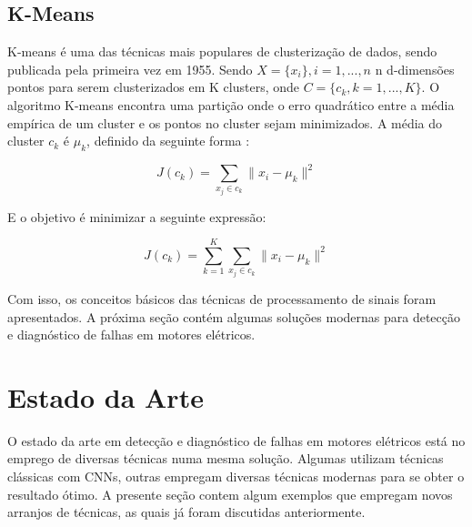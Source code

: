 % 

\subsection{K-Means}

K-means é uma das técnicas mais populares de clusterização de dados, sendo publicada pela primeira vez em 1955. Sendo $X=\{x_i\}, i=1, ..., n$
n d-dimensões pontos para serem clusterizados em K clusters, onde $C = \{c_k, k=1, ..., K\}$. O algoritmo K-means encontra uma partição onde o erro quadrático entre a média 
empírica de um cluster e os pontos no cluster sejam minimizados. A média do cluster $c_k$ é $\mu_k$, definido da seguinte forma \cite{Jain2010}:

\begin{equation}\label{eq:k-means}
    J(c_k) = \sum_{x_j\in c_k} {\parallel x_i-\mu_k \parallel^2}
\end{equation}

E o objetivo é minimizar a seguinte expressão:

\begin{equation}\label{eq:k-means}
    J(c_k) = \sum_{k=1}^{K}\sum_{x_j\in c_k} {\parallel x_i-\mu_k \parallel^2}
\end{equation}

Com isso, os conceitos básicos das técnicas de processamento de sinais foram apresentados. A próxima seção contém algumas soluções
modernas para detecção e diagnóstico de falhas em motores elétricos.


% 

\section{Estado da Arte}

O estado da arte em detecção e diagnóstico de falhas em motores elétricos está no emprego de diversas técnicas numa mesma solução. Algumas 
utilizam técnicas clássicas com CNNs, outras empregam diversas técnicas modernas para se obter o resultado ótimo. A presente seção contem
algum exemplos que empregam novos arranjos de técnicas, as quais já foram discutidas anteriormente.

% 

